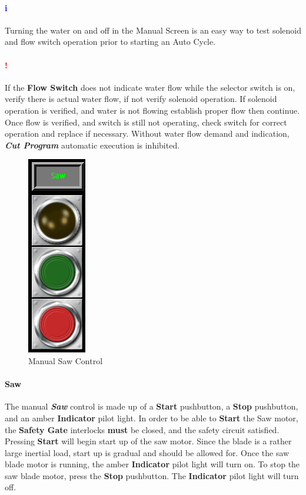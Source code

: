 \paragraph*{\textbf{\LARGE \textcolor{blue}{i}}}Turning the water on and off in the Manual Screen is an easy way to test solenoid and flow switch operation prior to starting an Auto Cycle.
\paragraph*{\textbf{{\LARGE \textcolor{red}{!}}}}If the \textbf{Flow Switch} does not indicate water flow while the selector switch is on, verify there is actual water flow, if not verify solenoid operation. If solenoid operation is verified, and water is not flowing establish proper flow then continue. Once flow is verified, and switch is still not operating, check switch for correct operation and replace if necessary. Without water flow demand and indication, \textbf{\textit{Cut Program}} automatic execution is inhibited.
\pagebreak
\nopagebreak
\begin{figure}
	\centering
	\includegraphics[width=.2\linewidth]{screen-captures/manual-saw}
	\caption{Manual Saw Control}
	\label{fig:manual-saw}
\end{figure}
\paragraph*{Saw}The manual \textbf{\textit{Saw}} control is made up of a \textbf{Start} pushbutton, a \textbf{Stop} pushbutton, and an amber \textbf{Indicator} pilot light. In order to be able to \textbf{Start} the Saw motor, the \textbf{Safety Gate} interlocks \textbf{must} be closed, and the safety circuit satisfied. Pressing \textbf{Start} will begin start up of the saw motor. Since the blade is a rather large inertial load, start up is gradual and should be allowed for. Once the saw blade motor is running, the amber \textbf{Indicator} pilot light will turn on. To stop the saw blade motor, press the \textbf{Stop} pushbutton. The \textbf{Indicator} pilot light will turn off.

